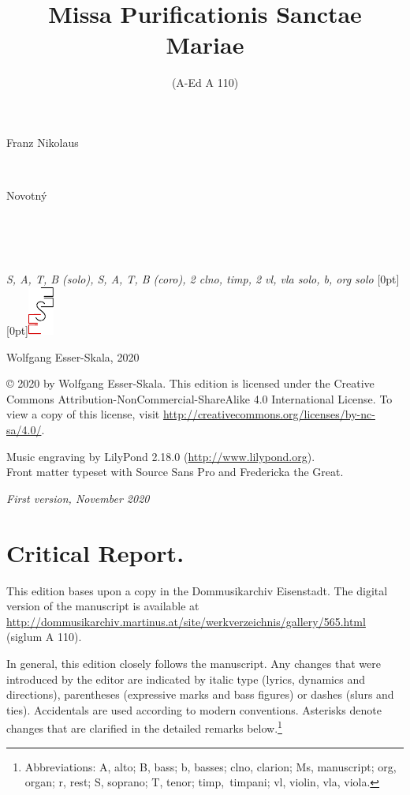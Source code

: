 \documentclass[parskip=full]{scrreprt}
\makeatletter
\DeclareRobustCommand{\sbseries}{\fontseries{sb}\selectfont}
\newcommand\fancytitlehead{
	\headingfont%
	\fontsize{80}{80}\selectfont\textcolor{black!80}{\@ifundefined{@shortname}{\@lastname}{\@shortname}.}\\[15pt]%
	\fontsize{60}{60}\selectfont\@ifundefined{@shorttitle}{\@title}{\@shorttitle}.%
}
\def\firstname#1{\def\@firstname{#1}}
\def\lastname#1{\def\@lastname{#1}}
\def\shorttitle#1{\def\@shorttitle{#1}}
\def\instrumentation#1{\def\@instrumentation{#1}}
\def\maketitle{%
\begin{titlepage}%
	\Large%
	{\@titlehead}%
	\vfill%
	{\strut\@firstname}\\%
	{\sbseries\color{oldred}\strut\@lastname}\\%
	{\strut\@namesuffix}%
	\vfill%
	{\sbseries\@title}\\%
	{\@subtitle}\\[\baselineskip]%
	{\itshape\@instrumentation}%
	\vfill%
	{\itshape\@parts}\hspace*{\fill}\raisebox{0pt}[0pt][0pt]{\includegraphics{ees_logo}}%
\end{titlepage}%
}
\newif\ifprintreport\printreportfalse
\makeatother
\begin{document}
\frenchspacing

\titlehead{\fancytitlehead}
\firstname{Franz Nikolaus}
\lastname{Novotný}
\title{Missa Purificationis Sanctae Mariae}
\shorttitle{M. Purificationis}
\subtitle{(A-Ed A 110)}
\instrumentation{S, A, T, B (solo), S, A, T, B (coro), 2 clno, timp, 2 vl, vla solo, b, org solo}
\maketitle


\thispagestyle{empty}

\vspace*{\fill}

\hspace*{1em}Wolfgang Esser-Skala, 2020

© 2020 by Wolfgang Esser-Skala. This edition is licensed under the Creative Commons Attribution-NonCommercial-ShareAlike 4.0 International License. To view a copy of this license, visit \url{http://creativecommons.org/licenses/by-nc-sa/4.0/}. 

Music engraving by LilyPond 2.18.0 (\url{http://www.lilypond.org}).\\
Front matter typeset with Source Sans Pro and Fredericka the Great.

\textit{First version, November 2020}

\vspace*{2cm}

\ifprintreport
\chapter*{Critical Report.}

This edition bases upon a copy in the Dommusikarchiv Eisenstadt. The digital version of the manuscript is available at \url{http://dommusikarchiv.martinus.at/site/werkverzeichnis/gallery/565.html} (siglum A 110).

In general, this edition closely follows the manuscript. Any changes that were introduced by the editor are indicated by italic type (lyrics, dynamics and directions), parentheses (expressive marks and bass figures) or dashes (slurs and ties). Accidentals are used according to modern conventions. Asterisks denote changes that are clarified in the detailed remarks below.\footnote{Abbreviations: A, alto; B, bass; b, basses; clno, clarion; Ms, manuscript; org, organ; r, rest; S, soprano; T, tenor; timp,~timpani; vl, violin, vla, viola.}
\end{document}
